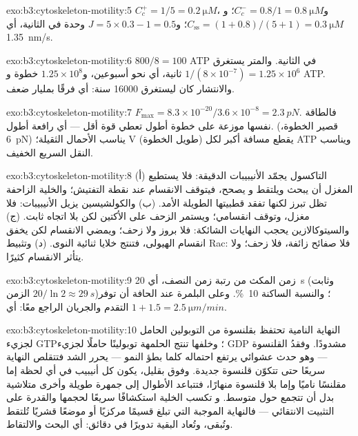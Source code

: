 \begin{solution}{exo:b3:cytoskeleton-motility:5}
$C_{c}^{+} = 1/5 = \qty{0.2}{\micro M}$، و$C_{c}^{-} = 0.8/1 =
\qty{0.8}{\micro M}$؛ و$C_{\text{ss}} = (1 + 0.8)/(5 + 1) = \qty{0.3}{\micro
M}$؛ و$J = 5\times 0.3 - 1 = 0.5$ وحدة في الثانية، أي \qty{1.35}{nm/s}.
\end{solution}

\begin{solution}{exo:b3:cytoskeleton-motility:6}
$800/8 = 100$ ATP في الثانية. والمتر يستغرق $1/(8\times 10^{-7}) =
1.25\times 10^{6}$ ثانية، أي نحو أسبوعين، و$1.25\times 10^{8}$ خطوة و
ATP. والانتشار كان ليستغرق \num{16000} سنة: أي فرقًا بمليار
ضعف.
\end{solution}

\begin{solution}{exo:b3:cytoskeleton-motility:7}
$F_{\max} = 8.3\times 10^{-20}/3.6\times 10^{-8} = \qty{2.3}{pN}$. فالطاقة
نفسها موزعة على خطوة أطول تعطي قوة أقل --- أي رافعة أطول.
 (قصير الخطوة، \qty{6}{pN}) يناسب الأحمال الثقيلة؛  V (طويل
الخطوة) يقطع مسافة أكبر لكل ATP ويناسب النقل السريع الخفيف.
\end{solution}

\begin{solution}{exo:b3:cytoskeleton-motility:8}
(أ) التاكسول يجمّد الأنيبيبات الدقيقة: فلا يستطيع المغزل أن يبحث ويلتقط و
يصحح، فيتوقف الانقسام عند نقطة التفتيش؛ والخلية الزاحفة تظل
تبرز لكنها تفقد قطبيتها الطويلة الأمد. (ب) والكولشيسين يزيل
الأنيبيبات: فلا مغزل، وتوقف انقسامي؛ ويستمر الزحف على الأكتين
لكن بلا اتجاه ثابت. (ج) والسيتوكالازين يحجب النهايات الشائكة: فلا
بروز ولا زحف؛ ويمضي الانقسام لكن يخفق انقسام الهيولى، فتنتج
خلايا ثنائية النوى. (د) وتثبيط Rac: فلا صفائح زائفة، فلا زحف؛
ولا يتأثر الانقسام كثيرًا.
\end{solution}

\begin{solution}{exo:b3:cytoskeleton-motility:9}
زمن المكث من رتبة زمن النصف، أي \qty{20}{s} (وثابت الزمن
$20/\ln 2 \approx \qty{29}{s}$)؛ والنسبة الساكنة \qty{10}{\%}.
وعلى البلمرة عند الحافة أن توفر التقدم والجريان
الراجع معًا: أي $1 + 1.5 = \qty{2.5}{\micro m/min}$.
\end{solution}

\begin{solution}{exo:b3:cytoskeleton-motility:10}
النهاية النامية تحتفظ بقلنسوة من التوبولين الحامل لجزيء GTP؛ وخلفها تنتج الحلمهة
توبولينًا حاملًا لجزيء GDP مشدودًا. وفقدُ القلنسوة --- وهو حدث عشوائي يرتفع
احتماله كلما بطؤ النمو --- يحرر الشد فتتقلص النهاية
سريعًا حتى تتكوّن قلنسوة جديدة. وفوق 
بقليل، يكون كل أنيبيب في أي لحظة إما مقلنسًا
ناميًا وإما بلا قلنسوة منهارًا، فتتباعد الأطوال إلى جمهرة
طويلة وأخرى متلاشية بدل أن تتجمع حول متوسط. و
تكسب الخلية استكشافًا سريعًا لحجمها والقدرة على
التثبيت الانتقائي --- فالنهاية الموجبة التي تبلغ قسيمًا مركزيًا أو
موضعًا قشريًا تُلتقط وتُبقى، وتُعاد البقية تدويرًا في
دقائق: أي البحث والالتقاط.
\end{solution}


